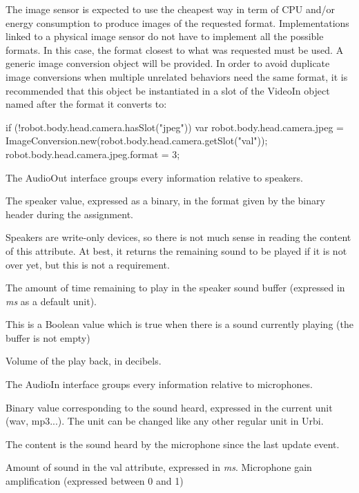 The image sensor is expected to use the cheapest way in term of CPU and/or
energy consumption to produce images of the requested format.
Implementations linked to a physical image sensor do not have to implement
all the possible formats. In this case, the format closest to what was
requested must be used.
A generic image conversion object will be provided. In order to avoid
duplicate image conversions when multiple unrelated behaviors need the same
format, it is recommended that this object be instantiated in a slot of the
VideoIn object named after the format it converts to:
\begin{urbiunchecked}
if (!robot.body.head.camera.hasSlot("jpeg"))
{
  var robot.body.head.camera.jpeg =
    ImageConversion.new(robot.body.head.camera.getSlot("val"));
  robot.body.head.camera.jpeg.format = 3;
}
\end{urbiunchecked}

The AudioOut interface groups every information relative to speakers.

\begin{slots}
  {%
    The speaker value, expressed as a binary, in the format given by
    the binary header during the assignment.

    Speakers are write-only devices, so there is not much sense in
    reading the content of this attribute. At best, it returns the
    remaining sound to be played if it is not over yet, but this is
    not a requirement.%
  }

  {%
    The amount of time remaining to play in the speaker sound buffer
    (expressed in \textit{ms} as a default unit).%
  }

  {%
    This is a Boolean value which is true when there is a sound
    currently playing (the buffer is not empty)%
  }

  {%
    Volume of the play back, in decibels.%
  }
\end{slots}




The AudioIn interface groups every information relative to microphones.

\begin{slots}
  {%
    Binary value corresponding to the sound heard, expressed in the
    current unit (wav, mp3...). The unit can be changed like any other
    regular unit in Urbi.

    The content is the sound heard by the microphone since the last
    update event.%
  }
  {%
    Amount of sound in the val attribute, expressed in \textit{ms}.%
  }
  {%
    Microphone gain amplification (expressed between 0 and 1)%
  }
\end{slots}


